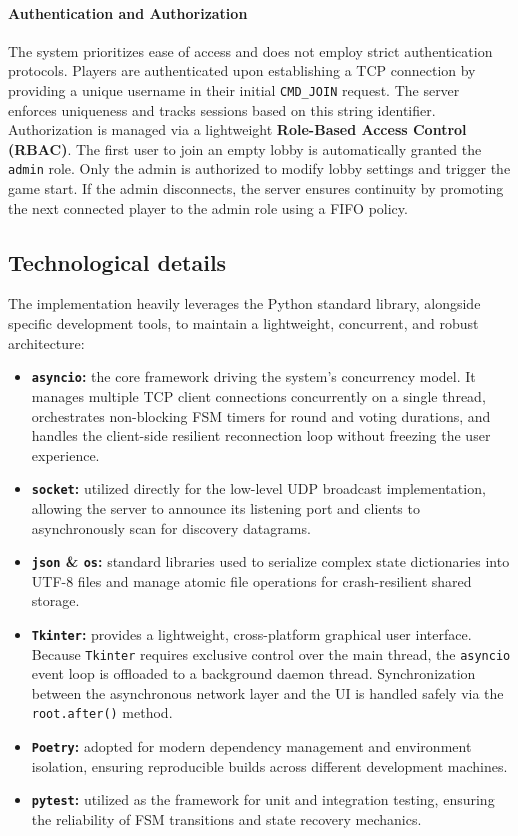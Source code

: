 \documentclass{scrartcl}
\begin{document}
\paragraph{Authentication and Authorization}
The system prioritizes ease of access and does not employ strict authentication protocols. 
Players are authenticated upon establishing a TCP connection by providing a unique username in their initial \texttt{CMD\_JOIN} request. 
The server enforces uniqueness and tracks sessions based on this string identifier.
Authorization is managed via a lightweight \textbf{Role-Based Access Control (RBAC)}. 
The first user to join an empty lobby is automatically granted the \texttt{admin} role. 
Only the admin is authorized to modify lobby settings and trigger the game start. 
If the admin disconnects, the server ensures continuity by promoting the next connected player to the admin role using a FIFO policy.

\subsection{Technological details}\label{technological-details}

The implementation heavily leverages the Python standard library, alongside specific development tools, to maintain a lightweight, concurrent, and robust architecture:

\begin{itemize}
  \item \textbf{\texttt{asyncio}:} the core framework driving the system's concurrency model. 
  It manages multiple TCP client connections concurrently on a single thread, orchestrates non-blocking FSM timers for round and voting durations, 
  and handles the client-side resilient reconnection loop without freezing the user experience.
  \item \textbf{\texttt{socket}:} utilized directly for the low-level UDP broadcast implementation, 
  allowing the server to announce its listening port and clients to asynchronously scan for discovery datagrams.
  \item \textbf{\texttt{json} \& \texttt{os}:} standard libraries used to serialize complex state dictionaries into UTF-8 files and manage atomic file operations for crash-resilient shared storage.
  \item \textbf{\texttt{Tkinter}:} provides a lightweight, cross-platform graphical user interface. 
  Because \texttt{Tkinter} requires exclusive control over the main thread, the \texttt{asyncio} event loop is offloaded to a background daemon thread. 
  Synchronization between the asynchronous network layer and the UI is handled safely via the \texttt{root.after()} method.
  \item \textbf{\texttt{Poetry}:} adopted for modern dependency management and environment isolation, ensuring reproducible builds across different development machines.
  \item \textbf{\texttt{pytest}:} utilized as the framework for unit and integration testing, ensuring the reliability of FSM transitions and state recovery mechanics.
\end{itemize}
\end{document}
